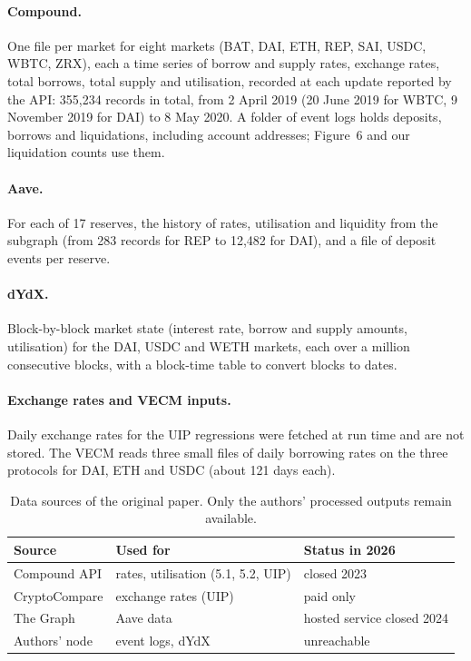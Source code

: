 \documentclass[11pt]{article}
\begin{document}
\paragraph{Compound.} One file per market for eight markets (BAT, DAI, ETH, REP, SAI, USDC, WBTC, ZRX), each a time series of borrow and supply rates, exchange rates, total borrows, total supply and utilisation, recorded at each update reported by the API: 355,234 records in total, from 2 April 2019 (20 June 2019 for WBTC, 9 November 2019 for DAI) to 8 May 2020. A folder of event logs holds deposits, borrows and liquidations, including account addresses; Figure~6 and our liquidation counts use them.

\paragraph{Aave.} For each of 17 reserves, the history of rates, utilisation and liquidity from the subgraph (from 283 records for REP to 12,482 for DAI), and a file of deposit events per reserve.

\paragraph{dYdX.} Block-by-block market state (interest rate, borrow and supply amounts, utilisation) for the DAI, USDC and WETH markets, each over a million consecutive blocks, with a block-time table to convert blocks to dates.

\paragraph{Exchange rates and VECM inputs.} Daily exchange rates for the UIP regressions were fetched at run time and are not stored. The VECM reads three small files of daily borrowing rates on the three protocols for DAI, ETH and USDC (about 121 days each).

\begin{table}[t]
\centering\small
\setlength{\tabcolsep}{4pt}
\begin{tabularx}{\columnwidth}{@{}>{\raggedright}p{2.0cm}>{\raggedright}X>{\raggedright\arraybackslash}p{1.8cm}@{}}
\toprule
Source & Used for & Status in 2026 \\
\midrule
Compound API & rates, utilisation (5.1, 5.2, UIP) & closed 2023 \\
CryptoCompare & exchange rates (UIP) & paid only \\
The Graph & Aave data & hosted service closed 2024 \\
Authors' node & event logs, dYdX & unreachable \\
\bottomrule
\end{tabularx}
\caption{Data sources of the original paper. Only the authors' processed outputs remain available.}
\label{tab:sources}
\end{table}
\end{document}

